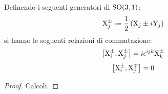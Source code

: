 \begin{proposition}
	Definendo i seguenti generatori di $ \mathrm{SO}(3,1) $:
	\begin{equation}
		\tens{X}^{\pm}_j \defeq \frac{1}{2} \left( \tens{X}_j \pm i \tens{Y}_j \right)
		\label{eq:10.26}
	\end{equation}
	si hanno le seguenti relazioni di commutazione:
	\begin{equation}
		\left[ \mathrm{X}^{\pm}_i, \mathrm{X}^{\pm}_j \right] = i \epsilon^{ijk} \mathrm{X}^{\pm}_k
		\label{eq:10.27}
	\end{equation}
	\begin{equation}
		\left[ \mathrm{X}^{\pm}_i, \mathrm{X}^{\mp}_j \right] = 0
		\label{eq:10.28}
	\end{equation}
\end{proposition}
\begin{proof}
	Calcoli.
\end{proof}

